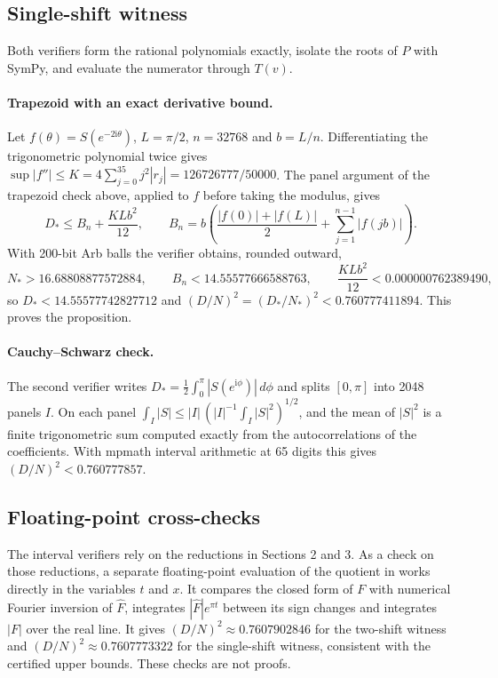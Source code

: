 \documentclass[11pt]{article}
\newcommand{\ii}{\mathrm i}
\begin{document}
\subsection*{Single-shift witness}
Both verifiers form the rational polynomials exactly, isolate the roots
of $P$ with SymPy, and evaluate the numerator through $T(v)$.

\paragraph{Trapezoid with an exact derivative bound.}
Let $f(\theta)=S(e^{-2\ii\theta})$, $L=\pi/2$, $n=32768$ and $b=L/n$.
Differentiating the trigonometric polynomial twice gives
$\sup|f''|\le K=4\sum_{j=0}^{35} j^2|r_j|=126726777/50000$. The panel
argument of the trapezoid check above, applied to $f$ before taking the
modulus, gives
\begin{equation}
 D_*\le B_n+\frac{KLb^2}{12},\qquad
 B_n=b\left(\frac{|f(0)|+|f(L)|}{2}+\sum_{j=1}^{n-1}|f(jb)|\right).
 \label{eq:trapS}
\end{equation}
With 200-bit Arb balls the verifier obtains, rounded outward,
\[
 N_*>16.68808877572884,\qquad
 B_n<14.55577666588763,\qquad
 \frac{KLb^2}{12}<0.000000762389490,
\]
so $D_*<14.55577742827712$ and $(D/N)^2=(D_*/N_*)^2<0.760777411894$.
This proves the proposition.

\paragraph{Cauchy--Schwarz check.}
The second verifier writes $D_*=\frac12\int_0^\pi|S(e^{\ii\phi})|\,d\phi$
and splits $[0,\pi]$ into 2048 panels $I$. On each panel
$\int_I|S|\le |I|\,(|I|^{-1}\int_I|S|^2)^{1/2}$, and the mean of
$|S|^2$ is a finite trigonometric sum computed exactly from the
autocorrelations of the coefficients. With mpmath interval arithmetic
at 65 digits this gives $(D/N)^2<0.760777857$.

\subsection*{Floating-point cross-checks}
The interval verifiers rely on the reductions in Sections 2 and 3. As a
check on those reductions, a separate floating-point evaluation of the
quotient in \cite[(1.1)]{cmqr} works directly in the variables $t$ and $x$. It compares the closed
form of $F$ with numerical Fourier inversion of $\widehat F$, integrates
$|\widehat F|e^{\pi t}$ between its sign changes and integrates $|F|$ over
the real line. It gives $(D/N)^2\approx0.7607902846$ for the two-shift
witness and $(D/N)^2\approx0.7607773322$ for the single-shift witness,
consistent with the certified upper bounds. These checks are not proofs.
\end{document}
